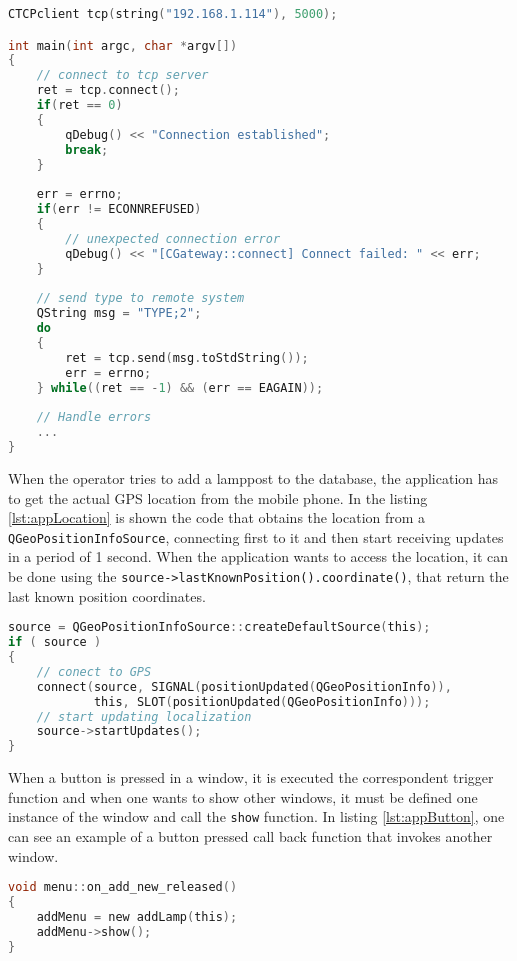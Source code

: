 \begin{lstlisting}[language=C, caption={Mobile Application: Connection to the server.}, label={lst:appConnection}]
CTCPclient tcp(string("192.168.1.114"), 5000);

int main(int argc, char *argv[])
{
	// connect to tcp server
	ret = tcp.connect();
	if(ret == 0)
	{
		qDebug() << "Connection established";
		break;
	}
	
	err = errno;
	if(err != ECONNREFUSED)
	{
		// unexpected connection error
		qDebug() << "[CGateway::connect] Connect failed: " << err;
	}
	
	// send type to remote system
	QString msg = "TYPE;2";	
	do
	{
		ret = tcp.send(msg.toStdString());
		err = errno;
	} while((ret == -1) && (err == EAGAIN));
	
	// Handle errors
	...
}
\end{lstlisting}

When the operator tries to add a lamppost to the database, the application has to get the actual GPS location from the mobile phone. In the listing \ref{lst:appLocation} is shown the code that obtains the location from a \verb|QGeoPositionInfoSource|, connecting first to it and then start receiving updates in a period of 1 second. When the application wants to access the location, it can be done using the \verb|source->lastKnownPosition().coordinate()|, that return the last known position coordinates.

\begin{lstlisting}[language=C, caption={Mobile Application: Obtain GPS coordinates.}, label={lst:appLocation}]
source = QGeoPositionInfoSource::createDefaultSource(this);
if ( source )
{
	// conect to GPS
	connect(source, SIGNAL(positionUpdated(QGeoPositionInfo)), 
			this, SLOT(positionUpdated(QGeoPositionInfo)));
	// start updating localization
	source->startUpdates();
}
\end{lstlisting}

When a button is pressed in a window, it is executed the correspondent trigger function and when one wants to show other windows, it must be defined one instance of the window and call the \verb|show| function. In listing \ref{lst:appButton}, one can see an example of a button pressed call back function that invokes another window.

\begin{lstlisting}[language=C, caption={Mobile Application: Button trigger function.}, label={lst:appButton}]
void menu::on_add_new_released()
{
	addMenu = new addLamp(this);
	addMenu->show();
}
\end{lstlisting}
